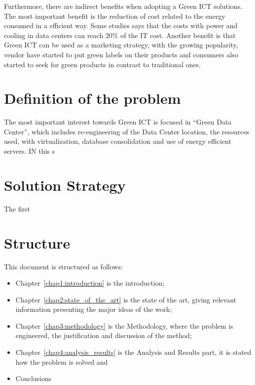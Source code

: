 	Furthermore, there are indirect benefits when adopting a Green ICT solutions. The most important benefit is the reduction of cost related to the energy consumed in a efficient way. Some studies says that the costs with power and cooling in data centers can reach 20\% of the IT cost. Another benefit is that Green ICT can be used as a marketing strategy, with the growing popularity, vendor have started to put green labels on their products and consumers also started to seek for green products in contrast to traditional ones.
    


\section{Definition of the problem} \label{sec1:problem}
	The most important interest towards Green ICT is focused in ``Green Data Center'', which includes re-engineering of the Data Center location, the resources used, with virtualization, database consolidation and use of energy efficient servers. IN this s
	
	
\section{Solution Strategy} \label{sec1:solution_strategy}
	The first


\section{Structure} \label{sec1:structure}
    This document is structured as follows:
    \begin{itemize}
    	\item Chapter~\ref{chap1:introduction} is the introduction;
    	\item Chapter~\ref{chap2:state_of_the_art} is the state of the art, giving relevant information presenting the major ideas of the work;
    	\item Chapter~\ref{chap3:methodology} is the Methodology, where the problem is engineered, the justification and discussion of the method;
    	\item Chapter~\ref{chap4:analysis_results} is the Analysis and Results part, it is stated how the problem is solved and 
    	\item Conclusions
    \end{itemize}
